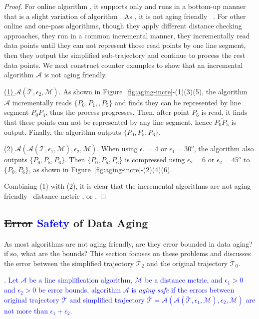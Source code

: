 \begin{proof}
	For online algorithm \squishe, it supports \sed only and runs in a bottom-up manner that is a slight variation of algorithm \tpa. As \tpa, it is not aging friendly \wrt~\sed.
	For other online and one-pass algorithms, though they apply different distance checking approaches, they run in a common incremental manner, \ie they incrementally read data points until they can not represent those read points by one line segment, then they output the simplified sub-trajectory and continue to process the rest data points. We next construct counter examples to show that an incremental algorithm $\mathcal{A}$ is not aging friendly.
	
	\underline{(1) ${\mathcal{A}}(\dddot{\mathcal{T}}, \epsilon_2, \mathcal{M})$}. As shown in Figure~\ref{fig:aging-incre}-(1)(3)(5), the algorithm $\mathcal{A}$ incrementally reads $\{P_0, P_1,\dddot, P_5\}$ and finds they can be represented by line segment $\overline{P_0P_4}$, thus the process progresses. Then, after point $P_6$ is read, it finds that these points can not be represented by any line segment, hence $\overline{P_0P_5}$ is output. Finally, the algorithm outputs $\{P_0, P_5, P_6\}$.
	
	\underline{(2) ${\mathcal{A}}(\mathcal{A}(\dddot{\mathcal{T}}, \epsilon_1, \mathcal{M}), \epsilon_2, \mathcal{M})$}. When using $\epsilon_1=4$ or $\epsilon_1=30^o $, the algorithm also outputs $\{P_0, P_5, P_6\}$. Then $\{P_0, P_5, P_6\}$ is compressed using $\epsilon_2=6$ or $\epsilon_2=45^o$ to $\{P_0, P_6\}$, as shown in Figure~\ref{fig:aging-incre}-(2)(4)(6).
	
	Combining (1) with (2), it is clear that the incremental algorithms are not aging friendly \wrt~distance metric \ped, \sed or \dad.
\end{proof}



\subsection{\sout{Error} \textcolor{blue}{Safety} of Data Aging}
\label{sec-aging-safe}
As most algorithms are not aging friendly, are they error bounded in data aging?
if so, what are the bounds?
This section focuses on these problems and discusses the error between the simplified trajectory $\overline{\mathcal{T}}_2$ and the original trajectory $\dddot{\mathcal{T}_0}$.

\stitle{\textcolor{blue}{Aging safe}}. \textcolor{blue}{Let $\mathcal{A}$ be a line simplification algorithm,  $\mathcal{M}$ be a distance metric, and $\epsilon_1>0$ and $\epsilon_2>0$ be error bounds, algorithm $\mathcal{A}$ is \emph{aging safe} if the errors between original trajectory $\dddot{\mathcal{T}}$ and simplified trajectory $\overline{\mathcal{T}}=\mathcal{A}(\mathcal{A}(\dddot{\mathcal{T}}, \epsilon_1, \mathcal{M}), \epsilon_2, \mathcal{M})$ are not more than $\epsilon_1+ \epsilon_2$. }


